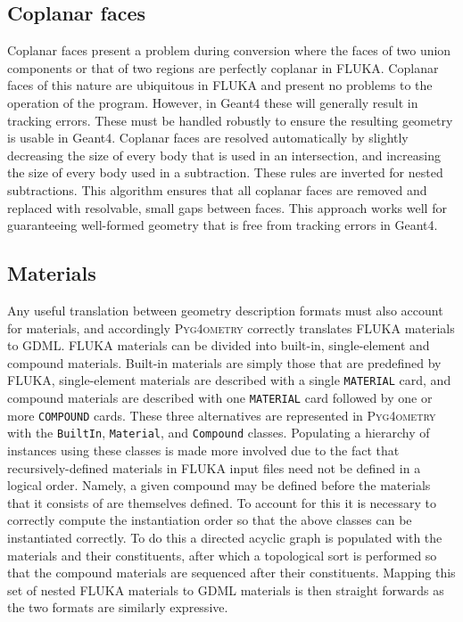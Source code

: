 \documentclass[final,5p,times,twocolumn]{elsarticle}
\newcommand{\pyinline}[1]{\lstinline[postbreak={}]{#1}}
\newcommand{\fluka}[1]{\texttt{\MakeUppercase{#1}}}
\newcommand{\PYGEOMETRY}{\textsc{Pyg4ometry}}
\begin{document}
\subsection{Coplanar faces}
Coplanar faces present a problem during conversion where the faces of two
union components or that of two regions are perfectly coplanar in FLUKA.
Coplanar faces of this nature are ubiquitous in FLUKA and present no
problems to the operation of the program.  However, in Geant4 these will
generally result in tracking errors.  These must be handled robustly to
ensure the resulting geometry is usable in Geant4.  Coplanar faces are resolved
automatically by slightly decreasing the size of every body that is used in
an intersection, and increasing the size of every body used in a
subtraction.  These rules are inverted for nested subtractions.  This
algorithm ensures that all coplanar faces are removed and replaced with
resolvable, small gaps between faces.  This approach works well for
guaranteeing well-formed geometry that is free from tracking errors in Geant4.

\subsection{Materials}

Any useful translation between geometry description formats must also
account for materials, and accordingly \PYGEOMETRY{} correctly translates
FLUKA materials to GDML.  FLUKA materials can be divided into built-in,
single-element and compound materials.  Built-in materials are simply those
that are predefined by FLUKA, single-element materials are described with a
single \fluka{material} card, and compound materials are described with one
\fluka{material} card followed by one or more \fluka{compound} cards.
These three alternatives are represented in \PYGEOMETRY{} with the
\pyinline{BuiltIn}, \pyinline{Material}, and \pyinline{Compound} classes.
Populating a hierarchy of instances using these classes is made more involved due to
the fact that recursively-defined materials in FLUKA input files need not
be defined in a logical order.  Namely, a given compound may be
defined before the materials that it consists of are themselves defined.
To account for this it is necessary to correctly compute the instantiation
order so that the above classes can be instantiated correctly.  To do this
a directed acyclic graph is populated with the materials and their
constituents, after which a topological sort is performed so that the
compound materials are sequenced after their constituents.  Mapping this
set of nested FLUKA materials to GDML materials is then
straight forwards as the two formats are similarly expressive.
\end{document}
